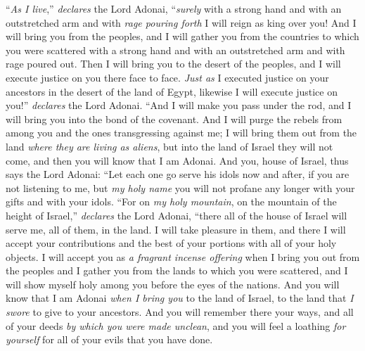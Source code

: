 \begin{biblechapter}
\verse “\textit{As I live},” \textit{declares} the Lord Adonai, “\textit{surely} with a strong hand and with an outstretched arm and with \textit{rage pouring forth} I will reign as king over you!
\verse And I will bring you from the peoples, and I will gather you from the countries to which you were scattered with a strong hand and with an outstretched arm and with rage poured out.
\verse Then I will bring you to the desert of the peoples, and I will execute justice on you there face to face.
\verse \textit{Just as} I executed justice on your ancestors in the desert of the land of Egypt, likewise I will execute justice on you!” \textit{declares} the Lord Adonai.
\verse “And I will make you pass under the rod, and I will bring you into the bond of the covenant.
\verse And I will purge the rebels from among you and the ones transgressing against me; I will bring them out from the land \textit{where they are living as aliens}, but into the land of Israel they will not come, and then you will know that I am Adonai.
\verse And you, house of Israel, thus says the Lord Adonai: “Let each one go serve his idols now and after, if you are not listening to me, but \textit{my holy name} you will not profane any longer with your gifts and with your idols.
\verse “For on \textit{my holy mountain}, on the mountain of the height of Israel,” \textit{declares} the Lord Adonai, “there all of the house of Israel will serve me, all of them, in the land. I will take pleasure in them, and there I will accept your contributions and the best of your portions with all of your holy objects.
\verse I will accept you as \textit{a fragrant incense offering} when I bring you out from the peoples and I gather you from the lands to which you were scattered, and I will show myself holy among you before the eyes of the nations.
\verse And you will know that I am Adonai \textit{when I bring you} to the land of Israel, to the land that \textit{I swore} to give to your ancestors.
\verse And you will remember there your ways, and all of your deeds \textit{by which you were made unclean}, and you will feel a loathing \textit{for yourself} for all of your evils that you have done.

\end{biblechapter}
